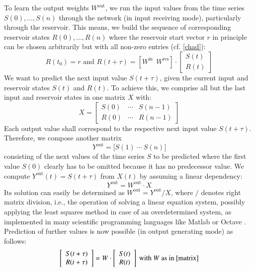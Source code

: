 \documentclass[preprint,12pt,times,authoryear]{elsarticle}%
\theoremstyle{definition}
\begin{document}
To learn the output weights $W^\mathrm{out}$, we run the input values from the
time series $S(0),\dots,S(n)$ through the network (in input receiving mode),
particularly through the reservoir. This means, we build the sequence of
corresponding reservoir states $R(0),\dots,R(n)$ where the reservoir start
vector $r$ in principle can be chosen arbitrarily but with all non-zero
entries (cf. \cref{chad}):
\begin{equation}\label{Res}
	R(t_0) = r \text{~and~} R(t+\tau) =
	\left[ W^\mathrm{in} ~~ W^\mathrm{res} \right] \cdot
	\left[ \begin{array}{c} S(t) \\ R(t) \end{array} \right]
\end{equation}
We want to predict the next input value $S(t+\tau)$, given the current input and
reservoir states $S(t)$ and $R(t)$. To achieve this, we comprise
all but the last input and reservoir states in one matrix $X$ with:
\begin{equation}\label{Xin}
    X = \left[ \begin{array}{ccc}
	S(0) & \cdots & S(n-1)\\
	R(0) & \cdots & R(n-1)
	\end{array} \right]
\end{equation}
Each output value shall correspond to the respective next input value $S(t+\tau)$.
Therefore, we compose another matrix
\begin{equation}\label{Yout}
	Y^\mathrm{out} = \big[ S(1)\ \cdots\ S(n) \big]
\end{equation}
consisting of the next values of the time series $S$ to be predicted
where the first value $S(0)$ clearly has to be omitted because it has no
predecessor value. We compute $Y^\mathrm{out}(t) = S(t+\tau)$ from $X(t)$ by
assuming a linear dependency:
\begin{equation}\label{linear}
	Y^\mathrm{out} = W^\mathrm{out} \cdot X
\end{equation}
Its solution can easily be determined as $W^\mathrm{out} = Y^\mathrm{out}/X$,
where $/$ denotes right matrix division, i.e., the operation of solving a linear
equation system, possibly applying the least squares method in case of an
overdetermined system, as implemented in many scientific programming languages
like Matlab \citep{HH17} or Octave \citep{EB+17}. Prediction of further values
is now possible (in output generating mode) as follows:
\begin{equation}\label{predict}
	\left[ \begin{array}{c} S(t+\tau) \\ R(t+\tau) \end{array} \right]
	= W \cdot \left[ \begin{array}{c} S(t) \\ R(t) \end{array} \right]
	\text{~with~} W \text{~as in \cref{matrix}}
\end{equation}
\end{document}
